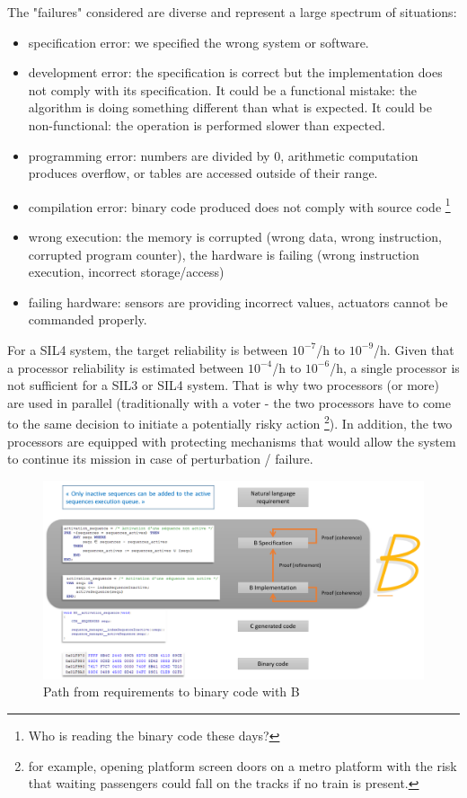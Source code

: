 \noindent The "failures" considered are diverse and represent a large spectrum of situations: 
\begin{itemize}
    \item specification error: we specified the wrong system or software.
    \item development error: the specification is correct but the implementation does not comply with its specification. It could be a functional mistake: the algorithm is doing something different than what is expected. It could be non-functional: the operation is performed slower than expected.
    \item programming error: numbers are divided by 0, arithmetic computation produces overflow, or tables are accessed outside of their range.
    \item compilation error: binary code produced does not comply with source code \footnote{Who is reading the binary code these days?}
    \item wrong execution: the memory is corrupted (wrong data, wrong instruction, corrupted program counter), the hardware is failing (wrong instruction execution, incorrect storage/access)
    \item failing hardware: sensors are providing incorrect values, actuators cannot be commanded properly.
\end{itemize}

For a SIL4 system, the target reliability is between $10^{-7}$/h to $10^{-9}$/h. Given that a processor reliability is estimated between $10^{-4}$/h to $10^{-6}$/h, a single processor is not sufficient for a SIL3 or SIL4 system. That is why two processors (or more) are used in parallel (traditionally with a voter - the two processors have to come to the same decision to initiate a potentially risky action \footnote{for example, opening platform screen doors on a metro platform with the risk that waiting passengers could fall on the tracks if no train is present.}). In addition, the two processors are equipped with protecting mechanisms that would allow the system to continue its mission in case of perturbation / failure.  



\begin{figure}[h]
\centering\includegraphics[scale=0.3]{Pictures/chapterSafetyPrinciples/SAFETY-Bcycle.png}
\caption{Path from requirements to binary code with B}
\label{safety:B}
\end{figure}

